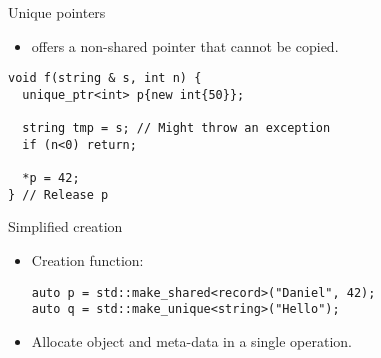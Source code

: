 \begin{frame}[t,fragile]{Unique pointers}
\begin{itemize}
  \item {} offers a non-shared pointer that cannot be copied.
\end{itemize}

\begin{lstlisting}
void f(string & s, int n) {
  unique_ptr<int> p{new int{50}};

  string tmp = s; // Might throw an exception
  if (n<0) return;

  *p = 42;
} // Release p
\end{lstlisting}
\end{frame}

\begin{frame}[t,fragile]{Simplified creation}
\begin{itemize}
  \item Creation function:
\begin{lstlisting}
auto p = std::make_shared<record>("Daniel", 42);
auto q = std::make_unique<string>("Hello");
\end{lstlisting}
  \item Allocate object and meta-data in a single operation.
\end{itemize}
\end{frame}

